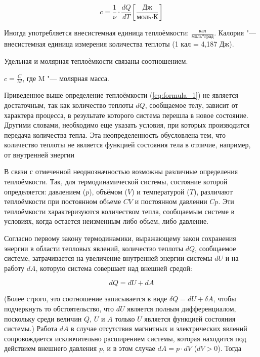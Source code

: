 \begin{equation}
c = \frac{1}{\nu} \cdot \frac{d Q}{d T} [\frac{\text{Дж}}{\text{моль} \cdot \text{К}}]
    \label{eq:formula_2}
\end{equation}

Иногда употребляется внесистемная единица теплоѐмкости: $\frac{\text{кал}}{\text{моль*град}}$. Калория "--- внесистемная единица измерения количества теплоты (1 кал = 4,187 Дж).

Удельная и молярная теплоѐмкости связаны соотношением.

$c = \frac{C}{M}$, где M "--- молярная масса.

Приведенное выше определение теплоёмкости (\ref{eq:formula_1}) не является достаточным, так как количество теплоты $dQ$, сообщаемое телу, зависит от характера процесса, в результате которого система перешла в новое состояние. Другими словами, необходимо еще указать условия, при которых производится передача количества тепла. Эта неопределенность  обусловлена тем, что количество теплоты не является функцией состояния тела в отличие, например, от внутренней энергии

В связи с отмеченной неоднозначностью возможны различные определения теплоёмкости. Так, для термодинамической системы, состояние которой определяется: давлением ($p$), объёмом ($V$) и температурой ($T$), различают теплоёмкости при постоянном объеме $CV$ и постоянном давлении $Cp$. Эти теплоёмкости характеризуются количеством тепла, сообщаемым системе в условиях, когда остается неизменным либо объем, либо давление.

Согласно первому закону термодинамики, выражающему закон сохранения энергии в области тепловых явлений, количество теплоты $dQ$, сообщаемое системе, затрачивается на увеличение внутренней энергии системы $dU$ и на работу $dA$, которую система совершает над внешней средой:

\begin{equation}
    d Q = d U + d A
    \label{eq:formula_3}
\end{equation}

(Более строго, это соотношение записывается в виде $\delta Q = dU + \delta A$, чтобы подчеркнуть то обстоятельство, что $dU$ является полным дифференциалом, поскольку среди величин $Q$, $U$ и $A$ только $U$ является функцией состояния системы.)
	Работа $dA$ в случае отсутствия магнитных и электрических явлений сопровождается исключительно расширением системы, которая находится под действием внешнего давления $p$, и в этом случае $dA = p \cdot dV$ ($dV > 0$). Тогда

